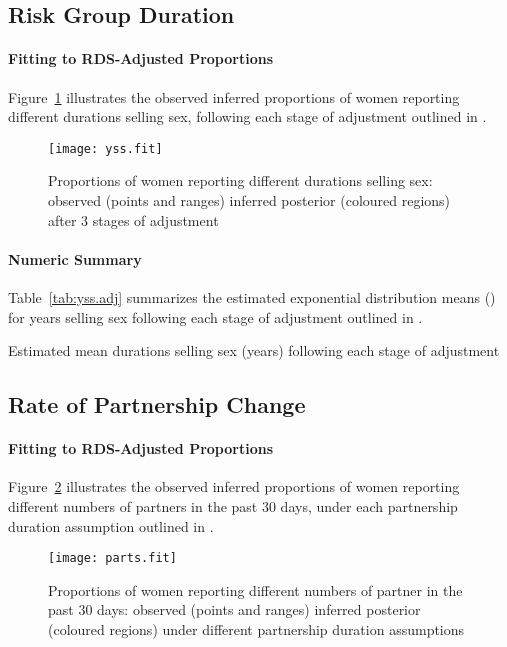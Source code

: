 \subsection{Risk Group Duration}\label{app.yss}
\paragraph{Fitting to RDS-Adjusted Proportions}
Figure~\ref{fig:yss.fit} illustrates
the observed \vs inferred proportions of women reporting
different durations selling sex,
following each stage of adjustment outlined in . 
\begin{figure}[h] %
  \centering\texttt{[image: yss.fit]}
  \caption{Proportions of women reporting different durations selling sex:
    observed (points and ranges) \vs inferred posterior (coloured regions)
    after 3 stages of adjustment}
  \label{fig:yss.fit}
\end{figure}
\paragraph{Numeric Summary}
Table~\ref{tab:yss.adj} summarizes the estimated exponential distribution means (\ci)
for years selling sex following each stage of adjustment outlined in .
\begin{table}[h]
  \centering
  \caption{Estimated mean durations selling sex (years) following each stage of adjustment}
  \label{tab:yss.adj}
  
\end{table}
\subsection{Rate of Partnership Change}\label{app.parts}
\paragraph{Fitting to RDS-Adjusted Proportions}
Figure~\ref{fig:parts.fit} illustrates
the observed \vs inferred proportions of women reporting
different numbers of partners in the past 30 days,
under each partnership duration assumption outlined in .
\begin{figure}[h]
  \centering\texttt{[image: parts.fit]}
  \caption{Proportions of women reporting different numbers of partner in the past 30 days:
    observed (points and ranges) \vs inferred posterior (coloured regions)
    under different partnership duration assumptions}
  \label{fig:parts.fit}
\end{figure}
